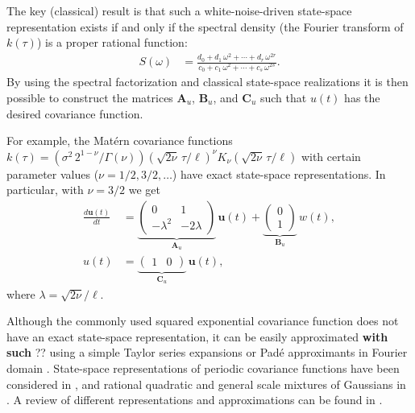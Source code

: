 \documentclass[journal]{IEEEtran}
\newcommand{\mauricio}[1]{{\color{blue}#1}}
\begin{document}
The key (classical) result is that such a white-noise-driven state-space representation exists if and only if the spectral density (the Fourier transform of $k(\tau)$) is a proper rational function:
%
\begin{equation}
\begin{split}
  S(\omega) &= \frac{d_0 + d_1 \, \omega^2 + \cdots + d_r \, \omega^{2r}}{c_0 + c_1 \, \omega^2 + \cdots + c_s \, \omega^{2s}}.
\end{split}
\end{equation}
%
By using the spectral factorization and classical state-space realizations \cite{Sarkka+Solin+Hartikainen:2013} it is then possible to construct the matrices $\mathbf{A}_u$, $\mathbf{B}_u$, and $\mathbf{C}_u$ such that $u(t)$ has the desired covariance function. 

For example, the Mat\'ern covariance functions  $k(\tau) = \left( \sigma^2 \, 2^{1-\nu} / \Gamma(\nu)\right) \left(\sqrt{2\nu}\,\tau / \ell \right)^\nu K_\nu\left(\sqrt{2\nu}\,\tau / \ell \right)$ with certain parameter values ($\nu=1/2,3/2,\ldots$) have exact state-space representations. In particular, with $\nu=3/2$ we get
\begin{equation}
\begin{split}
\frac{d\mathbf{u}(t)}{dt} &= \underbrace{\begin{pmatrix} 0 & 1 \\ -\lambda^2 & -2\lambda \end{pmatrix}}_{\mathbf{A}_u}
 \, \mathbf{u}(t)
+ \underbrace{\begin{pmatrix} 0 \\ 1 \end{pmatrix}}_{\mathbf{B}_u} \, w(t), \\
   u(t) &= \underbrace{\begin{pmatrix} 1 & 0 \end{pmatrix}}_{\mathbf{C}_u} \, \mathbf{u}(t),
\end{split}
\end{equation}
%
where $\lambda=\sqrt{2\nu}/\ell$. 

Although the commonly used squared exponential covariance function does not have an exact state-space representation, it
can be easily approximated \mauricio{\textbf{with such} ??} using a simple Taylor series expansions or Pad\'e approximants in Fourier domain \cite{Sarkka+Piche:2014,Karvonen+Sarkka:2016}. State-space representations of periodic covariance functions have been considered in \cite{Solin+Sarkka:2014a}, and rational quadratic and general scale mixtures of Gaussians in \cite{Solin+Sarkka:2014b}. A review of different representations and approximations can be found in \cite{Solin:2016}.
\end{document}
